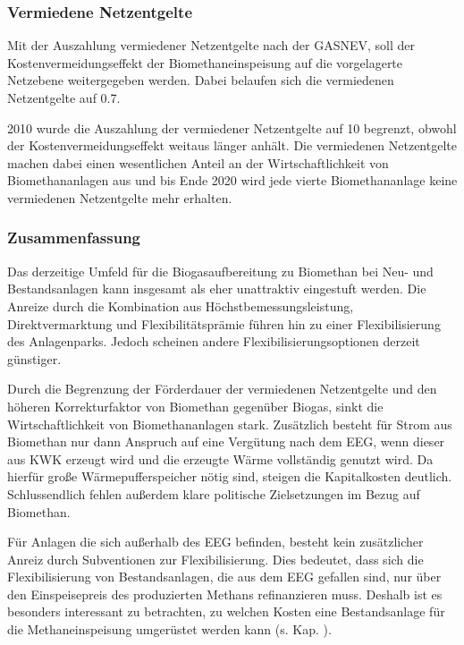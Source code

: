 \subsubsection{Vermiedene Netzentgelte}\label{chap:law_vN}

Mit der Auszahlung vermiedener Netzentgelte nach der \gls{GASNEV}, soll der Kostenvermeidungseffekt der Biomethaneinspeisung auf die vorgelagerte Netzebene weitergegeben werden. Dabei belaufen sich die vermiedenen Netzentgelte auf \SI[per-mode=symbol]{0.7}{\ctkwh}.\smallskip

\SI{2010}{\relax} wurde die Auszahlung der vermiedener Netzentgelte auf \SI{10}{\Jahre} begrenzt, obwohl der Kostenvermeidungseffekt weitaus länger anhält. Die vermiedenen Netzentgelte machen dabei einen wesentlichen Anteil an der Wirtschaftlichkeit von Biomethananlagen aus und bis Ende \SI{2020}{\relax} wird jede vierte Biomethananlage keine vermiedenen Netzentgelte mehr erhalten. \parencite{dena2018}


\subsubsection{Zusammenfassung}

Das derzeitige Umfeld für die Biogasaufbereitung zu Biomethan bei Neu- und Bestandsanlagen kann insgesamt als eher unattraktiv eingestuft werden. Die Anreize durch die Kombination aus Höchstbemessungsleistung, Direktvermarktung und Flexibilitätsprämie führen hin zu einer Flexibilisierung des Anlagenparks. Jedoch scheinen andere Flexibilisierungsoptionen derzeit günstiger.\smallskip

Durch die Begrenzung der Förderdauer der vermiedenen Netzentgelte und den höheren Korrekturfaktor von Biomethan gegenüber Biogas, sinkt die Wirtschaftlichkeit von Biomethananlagen stark. Zusätzlich besteht für Strom aus Biomethan nur dann Anspruch auf eine Vergütung nach dem \gls{EEG}, wenn dieser aus \gls{KWK} erzeugt wird und die erzeugte Wärme vollständig genutzt wird. Da hierfür große Wärmepufferspeicher nötig sind, steigen die Kapitalkosten deutlich. Schlussendlich fehlen außerdem klare politische Zielsetzungen im Bezug auf Biomethan. \smallskip

Für Anlagen die sich außerhalb des \gls{EEG} befinden, besteht kein zusätzlicher Anreiz durch Subventionen zur Flexibilisierung. Dies bedeutet, dass sich die Flexibilisierung von Bestandsanlagen, die aus dem \gls{EEG} gefallen sind, nur über den Einspeisepreis des produzierten Methans refinanzieren muss. Deshalb ist es besonders interessant zu betrachten, zu welchen Kosten eine Bestandsanlage für die Methaneinspeisung umgerüstet werden kann (s. Kap. ). %

